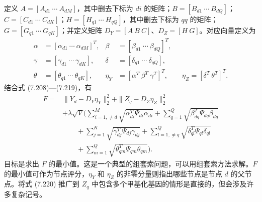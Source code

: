 定义 $A=[A_{d1}\ \cdots\ A_{dM}]$，其中删去下标为 $di$ 的矩阵；$B=[B_{d1}\ \cdots\ B_{dQ}]$；$C=[C_{d1}\ \cdots\ C_{dK}]$；$H=[H_{q1}\ \cdots\ H_{qQ}]$，其中删去下标为 $qq$ 的矩阵；$G=[G_{q1}\ \cdots\ G_{qK}]$；并定义矩阵 $D_Y=[A\ B\ C]$、$D_Z=[H\ G]$。对应向量定义为
\[
\begin{aligned}
\alpha&=[\alpha_{d1}\ \cdots\ \alpha_{dM}]^T,&
\beta&=[\beta_{d1}\ \cdots\ \beta_{dQ}]^T,\\
\gamma&=[\gamma_{d1}\ \cdots\ \gamma_{dK}],&
\delta&=[\delta_{q1}\ \cdots\ \delta_{qQ}],\\
\theta&=[\theta_{q1}\ \cdots\ \theta_{qK}],&
\eta_Y&=[\alpha^T\ \beta^T\ \gamma^T]^T,\qquad
\eta_Z=[\delta^T\ \theta^T]^T.
\end{aligned}
\]
结合式 (7.208)—(7.219)，有
\begin{equation}
\begin{aligned}
F={}&\|Y_d-D_Y\eta_Y\|_2^2+\|Z_q-D_Z\eta_Z\|_2^2\\
&+\lambda\sqrt V\Biggl(\sum_{i=1,\ne d}^{M}\sqrt{\alpha_{di}^T\Psi_{di}\alpha_{di}}
+\sum_{q=1}^{Q}\sqrt{\beta_{dq}^T\Psi_{dq}\beta_{dq}}\\
&\qquad+\sum_{j=1}^{K}\sqrt{\gamma_{dj}^T\Psi_{dj}\gamma_{dj}}
+\sum_{l=1,\ne q}^{Q}\sqrt{\delta_{ql}^T\Psi_{ql}\delta_{ql}}\\
&\qquad+\sum_{m=1}^{Q}\sqrt{\theta_{qm}^T\Psi_{qm}\theta_{qm}}\Biggr).
\end{aligned}
\tag{7.220}
\end{equation}
目标是求出 $F$ 的最小值。这是一个典型的组套索问题，可以用组套索方法求解。$F$ 的最小值可作为节点评分，$\eta_Y$ 和 $\eta_Z$ 的非零分量则指出哪些节点是节点 $d$ 的父节点。将式 (7.220) 推广到 $Z_q$ 中包含多个甲基化基因的情形是直接的，但会涉及许多复杂记号。
